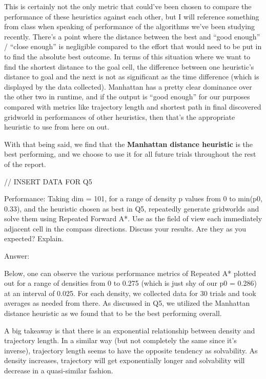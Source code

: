 \documentclass{homeworg}
\begin{document}
This is certainly not the only metric that could’ve been chosen to compare the performance of these heuristics against each other, but I will reference something from class when speaking of performance of the algorithms we've been studying recently. There’s a point where the distance between the best and “good enough” / “close enough” is negligible compared to the effort that would need to be put in to find the absolute best outcome. In terms of this situation where we want to find the shortest distance to the goal cell, the difference between one heuristic’s distance to goal and the next is not as significant as the time difference (which is displayed by the data collected). Manhattan has a pretty clear dominance over the other two in runtime, and if the output is “good enough” for our purposes compared with metrics like trajectory length and shortest path in final discovered gridworld in performances of other heuristics, then that’s the appropriate heuristic to use from here on out.

With that being said, we find that the \textbf{Manhattan distance heuristic} is the best performing, and we choose to use it for all future trials throughout the rest of the report.

// INSERT DATA FOR Q5

\newpage
\exercise*
Performance: Taking dim = 101, for a range of density p values from 0 to min(p0, 0.33), and the heuristic chosen as best in Q5, repeatedly generate gridworlds and solve them using Repeated
Forward A*. Use as the field of view each immediately adjacent cell in the compass directions. Discuss your results. Are they as you expected? Explain.

Answer:

Below, one can observe the various performance metrics of Repeated A* plotted out for a range of densities from 0 to 0.275 (which is just shy of our p0 = 0.286) at an interval of 0.025. For each density, we collected data for 30 trials and took averages as needed from there. As discussed in Q5, we utilized the Manhattan distance heuristic as we found that to be the best performing overall.

A big takeaway is that there is an exponential relationship between density and trajectory length. In a similar way (but not completely the same since it's inverse), trajectory length seems to have the opposite tendency as solvability. As density increases, trajectory will get exponentially longer and solvability will decrease in a quasi-similar fashion. 
\end{document}
